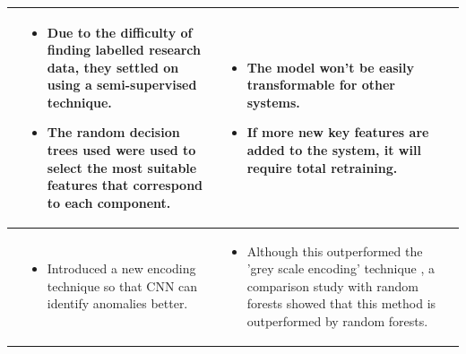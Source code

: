 \begin{longtable}{| p{25mm} | p{62mm} | p{62mm} |}
    \cite{kumarage2018anomaly} &
    \vspace{-8mm}
    \begin{itemize}[leftmargin=3mm,noitemsep,nolistsep] 
        \item Due to the difficulty of finding labelled research data, they settled on using a semi-supervised technique.
        \item The random decision trees used were used to select the most suitable features that correspond to each component.
        \vspace{-7mm}
    \end{itemize} &
    \vspace{-8mm}
    \begin{itemize}[leftmargin=3mm,noitemsep,nolistsep] 
        \item The model won't be easily transformable for other systems.
        \item If more new key features are added to the system, it will require total retraining.
        \vspace{-7mm}
    \end{itemize} \\ \hline
    
    \cite{kim2018encoding} &
    \vspace{-8mm}
    \begin{itemize}[leftmargin=3mm,noitemsep,nolistsep] 
        \item Introduced a new encoding technique so that CNN can identify anomalies better.
        \vspace{-7mm}
    \end{itemize} &
    \vspace{-8mm}
    \begin{itemize}[leftmargin=3mm,noitemsep,nolistsep] 
        \item Although this outperformed the 'grey scale encoding' technique \citep{dasgupta2002anomaly}, a comparison study with random forests showed that this method is outperformed by random forests.
        \vspace{-7mm}
    \end{itemize} \\ \hline
    

\end{longtable}
